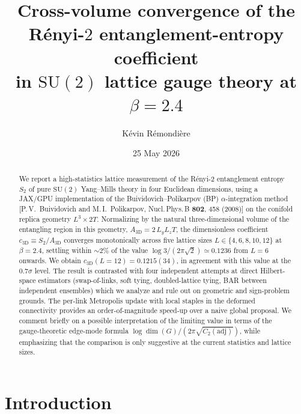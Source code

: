 \documentclass[aps,prl,reprint,superscriptaddress,floatfix,nofootinbib,amssymb]{revtex4-2}
\newcommand{\SUtwo}{\mathrm{SU}(2)}
\begin{document}
\title{Cross-volume convergence of the R\'enyi-$2$ entanglement-entropy coefficient \\
       in $\SUtwo$ lattice gauge theory at $\beta = 2.4$}

\author{K\'evin R\'emondi\`ere}
\date{25 May 2026}

\begin{abstract}
We report a high-statistics lattice measurement of the R\'enyi-$2$ entanglement entropy $S_2$ of pure $\SUtwo$ Yang--Mills theory in four Euclidean dimensions, using a JAX/GPU implementation of the Buividovich--Polikarpov (BP) $\alpha$-integration method [P.\,V.~Buividovich and M.\,I.~Polikarpov, Nucl.\,Phys.\,B \textbf{802}, 458 (2008)] on the conifold replica geometry $L^3\!\times\!2T$. Normalizing by the natural three-dimensional volume of the entangling region in this geometry, $A_{3\text{D}} = 2\, L_y L_z T$, the dimensionless coefficient $c_{3\text{D}} \equiv S_2/A_{3\text{D}}$ converges monotonically across five lattice sizes $L\in\{4,6,8,10,12\}$ at $\beta\!=\!2.4$, settling within $\sim\!2\%$ of the value $\log 3/(2\pi\sqrt 2)\simeq 0.1236$ from $L\!=\!6$ onwards. We obtain $c_{3\text{D}}(L=12)=0.1215(34)$, in agreement with this value at the $0.7\sigma$ level. The result is contrasted with four independent attempts at direct Hilbert-space estimators (swap-of-links, soft tying, doubled-lattice tying, BAR between independent ensembles) which we analyze and rule out on geometric and sign-problem grounds. The per-link Metropolis update with local staples in the deformed connectivity provides an order-of-magnitude speed-up over a naive global proposal. We comment briefly on a possible interpretation of the limiting value in terms of the gauge-theoretic edge-mode formula $\log\dim(G)/(2\pi\sqrt{C_2(\mathrm{adj})})$, while emphasizing that the comparison is only suggestive at the current statistics and lattice sizes.
\end{abstract}

\maketitle

\section{Introduction}
\end{document}
